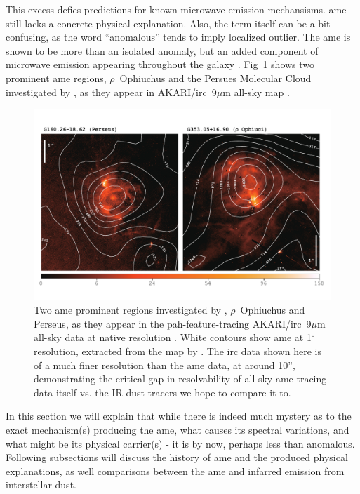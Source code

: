         This excess defies predictions for known microwave emission mechansisms. \gls{ame} still lacks a concrete physical explanation. Also, the term itself can be a bit confusing, as the word ``anomalous'' tends to imply localized outlier. The \gls{ame} is shown to be more than an isolated anomaly, but an added component of microwave emission appearing throughout the galaxy \citep{deoliveiracosta97,wmap03b,dickinson13r}. Fig~\ref{fig:AME_contours} shows two prominent \gls{ame} regions, $\rho{}$~Ophiuchus and the Persues Molecular Cloud investigated by \cite{tibbs11,planckxx11}, as they appear in AKARI/\gls{irc}~9$\mu$m all-sky map \citep{ishihara10}.
            \begin{figure}
              \centering
              \includegraphics[width=\textwidth]{../Plots/ch_intro/AME_contours.pdf}
                \caption{Two \gls{ame} prominent regions investigated by \cite{planckxx11, tibbs11}, $\rho$~Ophiuchus and Perseus, as they appear in the \gls{pah}-feature-tracing AKARI/\gls{irc}~9$\mu$m all-sky data at native resolution \citep{ishihara10}. White contours show \gls{ame} at 1$^\circ$ resolution, extracted from the map by  \cite{planck15X}. The \gls{irc} data shown here is of a much finer resolution than the \gls{ame} data, at around 10'', demonstrating the critical gap in resolvability of all-sky \gls{ame}-tracing data itself vs. the IR dust tracers we hope to compare it to. }
              \label{fig:AME_contours}
            \end{figure}
        In this section we will explain that while there is indeed much mystery as to the exact mechanism(s) producing the \gls{ame}, what causes its spectral variations, and what might be its physical carrier(s) - it is by now, perhaps less than anomalous. Following subsections will discuss the history of \gls{ame} and the produced physical explanations, as well comparisons between the \gls{ame} and infarred emission from interstellar dust.

